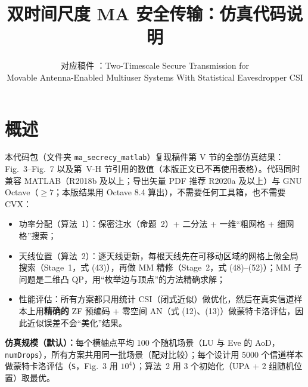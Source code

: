 \documentclass[11pt,a4paper]{ctexart}
\title{双时间尺度 MA 安全传输：仿真代码说明}
\author{对应稿件 \code{main.tex}：Two-Timescale Secure Transmission for\\ Movable Antenna-Enabled Multiuser Systems With Statistical Eavesdropper CSI}
\date{}
\newcommand{\code}[1]{\texttt{#1}}
\begin{document}
\sloppy
\maketitle
\tableofcontents

\section{概述}
本代码包（文件夹 \code{ma\_secrecy\_matlab}）复现稿件第 V 节的全部仿真结果：Fig.~3--Fig.~7 以及第~V-H 节引用的数值（本版正文已不再使用表格）。代码同时兼容 MATLAB（R2018b 及以上；导出矢量 PDF 推荐 R2020a 及以上）与 GNU Octave（$\ge 7$；本版结果用 Octave 8.4 算出），不需要任何工具箱，也不需要 CVX：
\begin{itemize}
\item 功率分配（算法~1）：保密注水（命题~2）+ 二分法 + 一维“粗网格 + 细网格”搜索；
\item 天线位置（算法~2）：逐天线更新，每根天线先在可移动区域的网格上做全局搜索（Stage~1，式 (43)），再做 MM 精修（Stage~2，式 (48)--(52)）；MM 子问题是二维凸 QP，用“枚举边与顶点”的方法精确求解；
\item 性能评估：所有方案都只用统计 CSI（闭式近似）做优化，然后在真实信道样本上用\textbf{精确的} ZF 预编码 + 零空间 AN（式 (12)、(13)）做蒙特卡洛评估，因此近似误差不会“美化”结果。
\end{itemize}

\textbf{仿真规模（默认）：}每个横轴点平均 100 个随机场景（LU 与 Eve 的 AoD，\code{numDrops}），所有方案共用同一批场景（配对比较）；每个设计用 5000 个信道样本做蒙特卡洛评估（\code{S}，Fig.~3 用 $10^4$）；算法~2 用 3 个初始化（UPA + 2 组随机位置）取最优。

\end{document}
